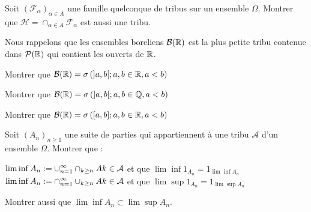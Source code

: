 \documentclass{report}
\begin{document}
\begin{exo}
    Soit \(\left(\mathcal{F}_\alpha\right)_{\alpha\in A}\) une famille quelconque de tribus sur un ensemble \(\Omega\).
    Montrer que \(\mathcal{H}=\cap_{\alpha\in A}\mathcal{F}_\alpha\) est aussi une tribu.
\end{exo}

\begin{exo}
    Nous rappelons que les ensembles boreliens \(\mathcal{B}(\mathbb{R})\) est la plus
    petite tribu contenue dans \(\mathcal{P}(\mathbb{R})\) qui contient les ouverts de \(\mathbb{R}\).
    \begin{q}{1}
        Montrer que \(\mathcal{B}(\mathbb{R})=\sigma\left( ]a,b[; a,b\in\mathbb{R}, a<b\right)\)
    \end{q}
    \begin{q}{2}
        Montrer que \(\mathcal{B}(\mathbb{R})=\sigma\left( ]a,b[; a,b\in\mathbb{Q}, a<b\right)\)
    \end{q}
    \begin{q}{3}
        Montrer que \(\mathcal{B}(\mathbb{R})=\sigma\left( [a,b]; a,b\in\mathbb{R}, a<b\right)\)
    \end{q}
\end{exo}

\begin{exo}
    Soit \(\left(A_n\right)_{n\geq1}\) une suite de parties qui appartiennent
    à une tribu \(\mathcal{A}\) d'un ensemble \(\Omega\). Montrer que :
    \begin{enumerate}
        \itt \(\displaystyle \lim\inf A_n := \cup_{n=1}^\infty\cap_{k\geq n} Ak \in \mathcal{A}\)
        et que \(\lim\inf 1_{A_n} = 1_{\lim\inf A_n}\)
        \itt \(\displaystyle \lim\inf A_n := \cap_{n=1}^\infty\cup_{k\geq n} Ak \in \mathcal{A}\)
        et que \(\lim\sup 1_{A_n} = 1_{\lim\sup A_n}\)
    \end{enumerate}
    Montrer aussi que \(\lim\inf A_n\subset\lim\sup A_n\).
\end{exo}
\end{document}
